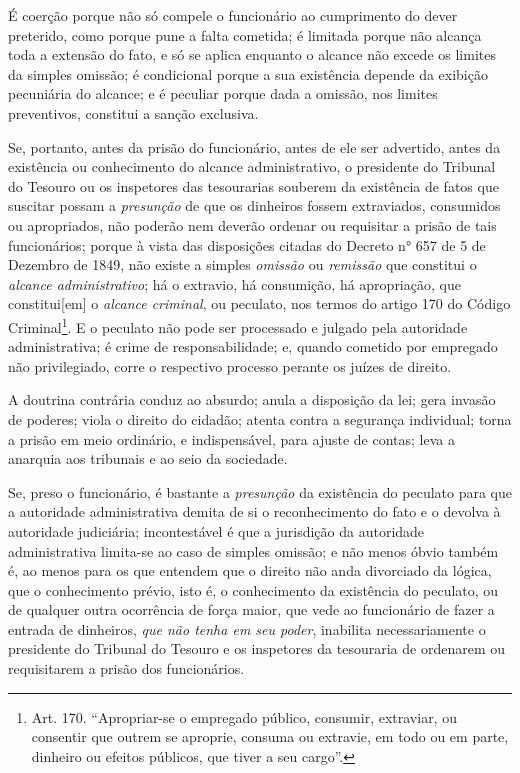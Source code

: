 É coerção porque não só compele o funcionário ao cumprimento do dever
preterido, como porque pune a falta cometida; é limitada porque não
alcança toda a extensão do fato, e só se aplica enquanto o alcance não
excede os limites da simples omissão; é condicional porque a sua
existência depende da exibição pecuniária do alcance; e é peculiar
porque dada a omissão, nos limites preventivos, constitui a sanção
exclusiva.

Se, portanto, antes da prisão do funcionário, antes de ele ser
advertido, antes da existência ou conhecimento do alcance
administrativo, o presidente do Tribunal do Tesouro ou os inspetores das
tesourarias souberem da existência de fatos que suscitar possam a
\emph{presunção} de que os dinheiros fossem extraviados, consumidos ou
apropriados, não poderão nem deverão ordenar ou requisitar a prisão de
tais funcionários; porque à vista das disposições citadas do Decreto n°
657 de 5 de Dezembro de 1849, não existe a simples \emph{omissão} ou
\emph{remissão} que constitui o \emph{alcance administrativo}; há o
extravio, há consumição, há apropriação, que constitui{[}em{]} o
\emph{alcance criminal}, ou peculato, nos termos do artigo 170 do Código
Criminal\footnote{Art. 170. ``Apropriar-se o empregado público,
  consumir, extraviar, ou consentir que outrem se aproprie, consuma ou
  extravie, em todo ou em parte, dinheiro ou efeitos públicos, que tiver
  a seu cargo''.}. E o peculato não pode ser processado e julgado pela
autoridade administrativa; é crime de responsabilidade; e, quando
cometido por empregado não privilegiado, corre o respectivo processo
perante os juízes de direito.

A doutrina contrária conduz ao absurdo; anula a disposição da lei; gera
invasão de poderes; viola o direito do cidadão; atenta contra a
segurança individual; torna a prisão em meio ordinário, e indispensável,
para ajuste de contas; leva a anarquia aos tribunais e ao seio da
sociedade.

Se, preso o funcionário, é bastante a \emph{presunção} da existência do
peculato para que a autoridade administrativa demita de si o
reconhecimento do fato e o devolva à autoridade judiciária;
incontestável é que a jurisdição da autoridade administrativa limita-se
ao caso de simples omissão; e não menos óbvio também é, ao menos para os
que entendem que o direito não anda divorciado da lógica, que o
conhecimento prévio, isto é, o conhecimento da existência do peculato,
ou de qualquer outra ocorrência de força maior, que vede ao funcionário
de fazer a entrada de dinheiros, \emph{que não tenha em seu poder},
inabilita necessariamente o presidente do Tribunal do Tesouro e os
inspetores da tesouraria de ordenarem ou requisitarem a prisão dos
funcionários.

